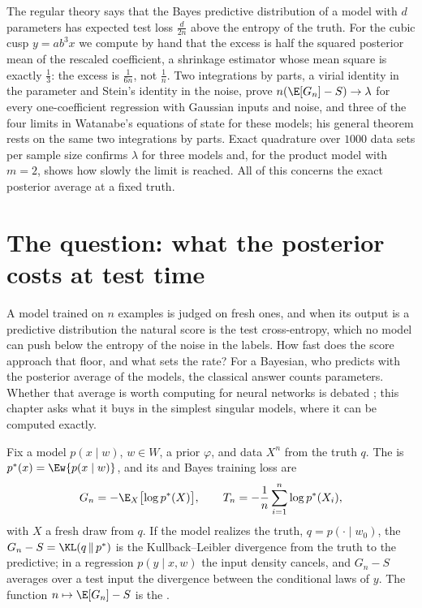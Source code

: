 \begin{refsection}

\begin{chaptersummary}
The regular theory says that the Bayes predictive distribution of a model with $d$ parameters has expected test loss $\frac d{2n}$ above the entropy of the truth. For the cubic cusp $y=ab^3x$ we compute by hand that the excess is half the squared posterior mean of the rescaled coefficient, a shrinkage estimator whose mean square is exactly $\frac13$: the excess is $\frac1{6n}$, not $\frac1n$. Two integrations by parts, a virial identity in the parameter and Stein's identity in the noise, prove $n(\E[G_n]-S)\to\lambda$ for every one-coefficient regression with Gaussian inputs and noise, and three of the four limits in Watanabe's equations of state for these models; his general theorem rests on the same two integrations by parts. Exact quadrature over $1000$ data sets per sample size confirms $\lambda$ for three models and, for the product model with $m=2$, shows how slowly the limit is reached. All of this concerns the exact posterior average at a fixed truth.
\end{chaptersummary}

\section{The question: what the posterior costs at test time}\label{sec:generalization:question}

A model trained on $n$ examples is judged on fresh ones, and when its output is a predictive distribution the natural score is the test cross-entropy, which no model can push below the entropy of the noise in the labels. How fast does the score approach that floor, and what sets the rate? For a Bayesian, who predicts with the posterior average of the models, the classical answer counts parameters. Whether that average is worth computing for neural networks is debated \parencite{WenzelEtAl2020,IzmailovEtAl2021}; this chapter asks what it buys in the simplest singular models, where it can be computed exactly.

Fix a model $p(x\mid w)$, $w\in W$, a prior $\varphi$, and data $X^n$ from the truth $q$. The  is $p^*(x)=\Ew{p(x\mid w)}$, and its  and Bayes training loss are
\[
G_n=-\E_X\bigl[\log p^*(X)\bigr],\qquad T_n=-\frac1n\sum_{i=1}^n\log p^*(X_i),
\]
with $X$ a fresh draw from $q$. If the model realizes the truth, $q=p(\cdot\mid w_0)$, the  $G_n-S=\KL(q\,\|\,p^*)$ is the Kullback--Leibler divergence from the truth to the predictive; in a regression $p(y\mid x,w)$ the input density cancels, and $G_n-S$ averages over a test input the divergence between the conditional laws of $y$. The function $n\mapsto\E[G_n]-S$ is the .


\end{refsection}

